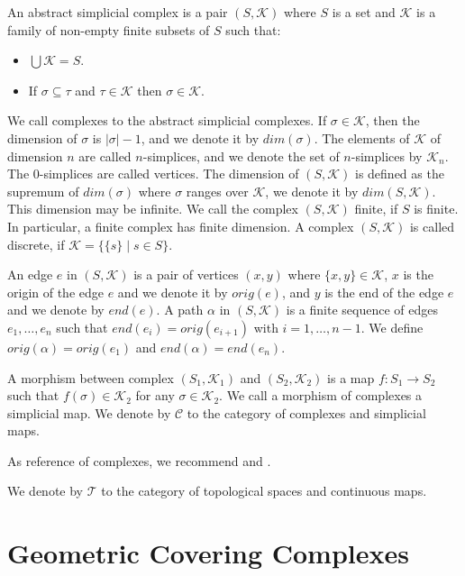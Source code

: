 \documentclass{amsart}
\begin{document}
An abstract simplicial complex is a pair $(S,\mathcal{K})$ where $S$ is a set and $\mathcal{K}$ is a family of non-empty finite subsets of $S$ such that:
\begin{itemize}
\item $\bigcup\mathcal{K}=S$.
\item If $\sigma\subseteq \tau$ and $\tau\in \mathcal{K}$ then $\sigma\in\mathcal{K}$.
\end{itemize}
We call complexes to the abstract simplicial complexes.  If $\sigma\in \mathcal{K}$, then the dimension of $\sigma$ is $\vert\sigma\vert-1$, and we denote it by $dim(\sigma)$. The elements of $\mathcal{K}$ of dimension $n$ are called $n$-simplices, and we denote the set of $n$-simplices by $\mathcal{K}_n$. The $0$-simplices are called vertices. The dimension of $(S,\mathcal{K})$ is defined as the supremum of $dim(\sigma)$ where $\sigma$ ranges over $\mathcal{K}$, we denote it by $dim(S,\mathcal{K})$. This dimension may be infinite. We call the complex $(S,\mathcal{K})$  finite, if $S$ is finite. In particular, a finite complex has finite dimension. A complex $(S,\mathcal{K})$ is called discrete, if $\mathcal{K}=\{\{s\}\mid s\in S\}$.

An edge $e$ in $(S,\mathcal{K})$ is a pair of vertices  $(x,y)$ where $\{x,y\}\in\mathcal{K}$, $x$ is the origin of the edge $e$ and we denote it by $orig(e)$, and $y$ is the end of the edge $e$ and we denote by $end(e)$. A path $\alpha$ in $(S,\mathcal{K})$ is a finite sequence of edges $e_1,\dots,e_n$ such that $end(e_i)=orig(e_{i+1})$ with $i=1,\dots,n-1$. We define $orig(\alpha)=orig(e_1)$ and $end(\alpha)=end(e_n)$. 

A morphism between complex $(S_1,\mathcal{K}_1)$ and $(S_2,\mathcal{K}_2)$ is a map $f\colon S_1\longrightarrow S_2$ such that $f(\sigma)\in \mathcal{K}_2$ for any $\sigma\in\mathcal{K}_2$. We call a morphism of complexes a simplicial map. We  denote by $\mathcal{C}$ to the category of complexes and simplicial maps.

As reference of complexes, we recommend \cite{singer2015lecture}  and \cite{spanier1989algebraic}.

We  denote by $\mathcal{T}$ to the category of topological spaces and continuous maps.


\section{Geometric Covering Complexes}
\end{document}
